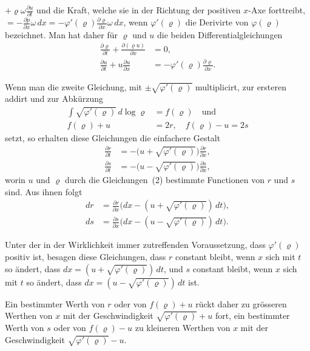 \documentclass[12pt,a4paper]{article}
\begin{document}
$+\varrho\omega\frac{\partial u}{\partial t}$ und die Kraft, welche sie in der Richtung der positiven $x$-Axe forttreibt, $= -\frac{\partial p}{\partial x}\omega\,dx = -\varphi'(\varrho)\frac{\partial\varrho}{\partial x}\omega\,dx$, wenn $\varphi'(\varrho)$ die Derivirte von $\varphi(\varrho)$ bezeichnet. Man hat daher f\"ur $\varrho$ und $u$ die beiden Differentialgleichungen
\begin{align*}
\frac{\partial\varrho}{\partial t} + \frac{\partial(\varrho u)}{\partial x} &= 0,\tag{1}\\
\frac{\partial u}{\partial t} + u\frac{\partial u}{\partial x} &= -\varphi'(\varrho)\frac{\partial\varrho}{\partial x}.\tag{2}
\end{align*}

Wenn man die zweite Gleichung, mit $\pm\sqrt{\varphi'(\varrho)}$ multiplicirt, zur ersteren addirt und zur Abk\"urzung
\begin{align*}
\int\sqrt{\varphi'(\varrho)}\,d\log\varrho &= f(\varrho)\quad\text{und}\\
f(\varrho) + u &= 2r,\quad f(\varrho) - u = 2s\tag{2}
\end{align*}
setzt, so erhalten diese Gleichungen die einfachere Gestalt
\begin{align*}
\frac{\partial r}{\partial t} &= -\bigl(u + \sqrt{\varphi'(\varrho)}\bigr)\frac{\partial r}{\partial x},\\
\frac{\partial s}{\partial t} &= -\bigl(u - \sqrt{\varphi'(\varrho)}\bigr)\frac{\partial s}{\partial x},\tag{3}
\end{align*}
worin $u$ und $\varrho$ durch die Gleichungen~(2) bestimmte Functionen von $r$ und $s$ sind. Aus ihnen folgt
\begin{align*}
dr &= \frac{\partial r}{\partial x}\bigl(dx - (u + \sqrt{\varphi'(\varrho)})\,dt\bigr),\\
ds &= \frac{\partial s}{\partial x}\bigl(dx - (u - \sqrt{\varphi'(\varrho)})\,dt\bigr).\tag{4,5}
\end{align*}

Unter der in der Wirklichkeit immer zutreffenden Voraussetzung, dass $\varphi'(\varrho)$ positiv ist, besagen diese Gleichungen, dass $r$ constant bleibt, wenn $x$ sich mit $t$ so \"andert, dass $dx = (u + \sqrt{\varphi'(\varrho)})\,dt$, und $s$ constant bleibt, wenn $x$ sich mit $t$ so \"andert, dass $dx = (u - \sqrt{\varphi'(\varrho)})\,dt$ ist.

Ein bestimmter Werth von $r$ oder von $f(\varrho) + u$ r\"uckt daher zu gr\"osseren Werthen von $x$ mit der Geschwindigkeit $\sqrt{\varphi'(\varrho)} + u$ fort, ein bestimmter Werth von $s$ oder von $f(\varrho) - u$ zu kleineren Werthen von $x$ mit der Geschwindigkeit $\sqrt{\varphi'(\varrho)} - u$.
\end{document}
